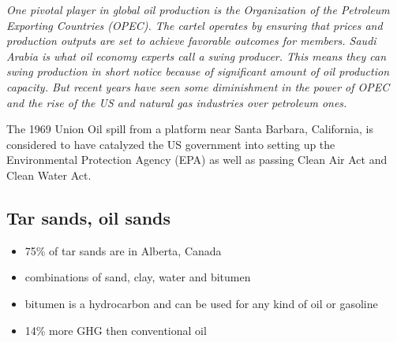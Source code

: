 \textit{
One pivotal player in global oil production is the Organization of the
Petroleum Exporting Countries (OPEC). The cartel operates by ensuring that
prices and production outputs are set to achieve favorable outcomes for
members. Saudi Arabia is what oil economy experts call a swing producer. This
means they can swing production in short notice because of significant amount
of oil production capacity. But recent years have seen some diminishment in
the power of OPEC and the rise of the US and natural gas industries over
petroleum ones.
}

The 1969 Union Oil spill from a platform near Santa Barbara, California, is
considered to have catalyzed the US government into setting up the
Environmental Protection Agency (EPA) as well as passing Clean Air Act and
Clean Water Act.

\subsection{Tar sands, oil sands}

\begin{itemize}
	\item 75\% of tar sands are in Alberta, Canada
	\item combinations of sand, clay, water and bitumen
	\item bitumen is a hydrocarbon and can be used for any kind of oil or
	gasoline
	\item 14\% more GHG then conventional oil
\end{itemize}
